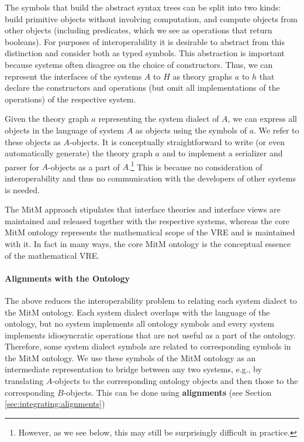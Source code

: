The symbols that build the abstract syntax trees can be split into two kinds:  build primitive objects without involving computation, and 
compute objects from other objects (including predicates, which we see as operations that return booleans).
For purposes of interoperability it is desirable to abstract from this distinction and consider both as typed symbols.
This abstraction is important because systems often disagree on the choice of constructors.
Thus, we can represent the interfaces of the systems $A$ to $H$ as \OMMT theory graphs $a$ to $h$ that declare the constructors and operations (but omit all implementations of the operations) of the respective system.

Given the theory graph $a$ representing the system dialect of $A$, we can express all objects in the language of system $A$ as \OMMT objects using the symbols of $a$.
We refer to these objects as $A$-objects.
It is conceptually straightforward to write (or even automatically generate) the theory graph $a$ and to implement a serializer and parser for $A$-objects as a part of $A$.\footnote{However, as we see below, this may still be surprisingly difficult in practice.}
This is because no consideration of interoperability and thus no communication with the developers of other systems is needed.

The MitM approach stipulates that interface theories and interface views are maintained and released together with the respective systems, whereas the core MitM ontology represents the mathematical scope of the VRE and is maintained with it. In fact in many ways, the core MitM ontology is the conceptual essence of the mathematical VRE.

\paragraph{Alignments with the Ontology}
The above reduces the interoperability problem to relating each system dialect to the MitM ontology.
Each system dialect overlaps with the language of the ontology, but no system implements all ontology symbols and every system implements idiosyncratic operations that are not useful as a part of the ontology.
Therefore, some system dialect symbols are related to corresponding symbols in the MitM ontology.
We use these symbols of the MitM ontology as an intermediate representation to bridge between any two systems, e.g., by translating $A$-objects to the corresponding ontology objects and then those to the corresponding $B$-objects. This can be done using \OMMT \textbf{alignments} (see Section \ref{sec:integrating:alignments})

